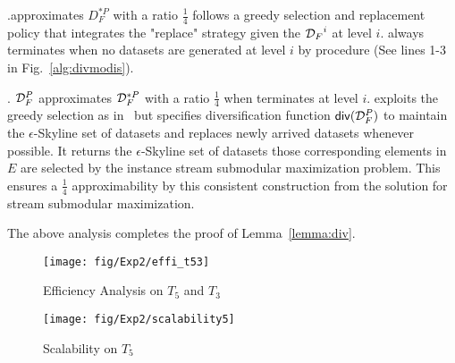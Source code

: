 .\divmodis approximates
$D_F^{*P}$ with a ratio $\frac{1}{4}$ follows a greedy selection and replacement policy that integrates the "replace" strategy given the  ${{\mathcal D}_F}^{i}$ at level $i$.
\divmodis always terminates
when no datasets are generated at level $i$ by procedure \upi (See lines 1-3 in Fig.~\ref{alg:divmodis}).


.
${\mathcal D}^{P}_F$ approximates ${\mathcal D}^{*P}_F$ 
with a ratio $\frac{1}{4}$ 
when terminates at level $i$. 
\divmodis exploits the greedy selection 
as in~\cite{chakrabarti2015submodular} but specifies diversification function ${\mathsf{div}}({\mathcal D}^{P}_F)$ to maintain the $\epsilon$-Skyline set of datasets and replaces newly arrived datasets whenever possible.  
It returns the $\epsilon$-Skyline set of datasets those corresponding 
elements in $E$ are selected by the instance stream submodular maximization problem. This ensures a $\frac{1}{4}$ 
approximability by this consistent construction from the solution 
for stream submodular maximization.

The above analysis completes the proof of Lemma~\ref{lemma:div}.

\begin{figure}[tb!]
\centerline{\texttt{[image: fig/Exp2/effi\_t53]}}
\centering
\vspace{-1ex}
\caption{Efficiency Analysis on $T_5$ and $T_3$}
\label{fig:effict53}
\end{figure}

\begin{figure}[tb!]
\centerline{\texttt{[image: fig/Exp2/scalability5]}}
\centering
\caption{Scalability on $T_5$}
\label{fig:scala5}
\end{figure}

